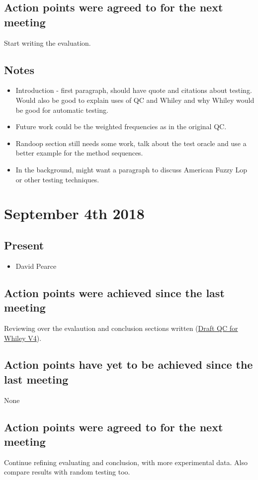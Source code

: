 \documentclass[]{article}
\begin{document}
\subsection{Action points were agreed to for the next meeting}
Start writing the evaluation.

\subsection{Notes}
\begin{itemize}
	\item Introduction - first paragraph, should have quote and citations about testing. Would also be good to explain uses of QC and Whiley and why Whiley would be good for automatic testing.
	\item Future work could be the weighted frequencies as in the original QC.
	\item Randoop section still needs some work, talk about the test oracle and use a better example for the method sequences.
	\item In the background, might want a paragraph to discuss American Fuzzy Lop or other testing techniques.
\end{itemize}

\section{September 4th 2018}
\subsection{Present}
\begin{itemize}
	\item David Pearce
\end{itemize}

\subsection{Action points were achieved since the last meeting}
Reviewing over the evalaution and conclusion sections written (\href{https://gitlab.ecs.vuw.ac.nz/project489-2018/chinjani/quickcheck-for-whiley-final-report/blob/master/Draft%20V4%20QuickCheck%20for%20Whiley%20-%20Janice%20Chin.pdf}{Draft QC for Whiley V4}).  
\subsection{Action points have yet to be achieved since the last meeting}
None
\subsection{Action points were agreed to for the next meeting}
Continue refining evaluating and conclusion, with more experimental data. Also compare results with random testing too.
\end{document}
